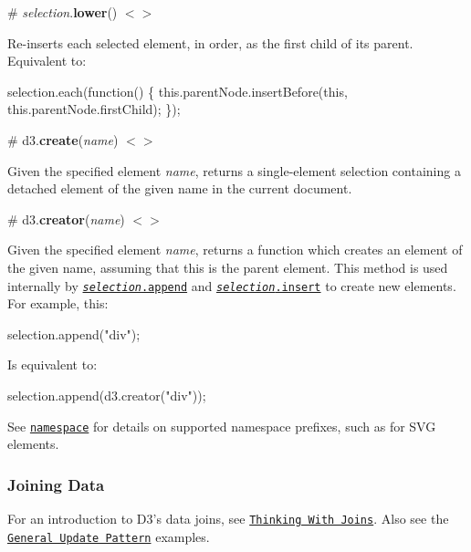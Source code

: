 \label{_selection_lower}%
\# {\itshape selection}.{\bfseries lower}() \href{https://github.com/d3/d3-selection/blob/master/src/selection/lower.js}{\tt $<$$>$}

Re-\/inserts each selected element, in order, as the first child of its parent. Equivalent to\+:


\begin{DoxyCode}
selection.each(function() \{
  this.parentNode.insertBefore(this, this.parentNode.firstChild);
\});
\end{DoxyCode}


\label{_create}%
\# d3.{\bfseries create}({\itshape name}) \href{https://github.com/d3/d3-selection/blob/master/src/create.js}{\tt $<$$>$}

Given the specified element {\itshape name}, returns a single-\/element selection containing a detached element of the given name in the current document.

\label{_creator}%
\# d3.{\bfseries creator}({\itshape name}) \href{https://github.com/d3/d3-selection/blob/master/src/creator.js}{\tt $<$$>$}

Given the specified element {\itshape name}, returns a function which creates an element of the given name, assuming that {\ttfamily this} is the parent element. This method is used internally by \href{#selection_append}{\tt {\itshape selection}.append} and \href{#selection_insert}{\tt {\itshape selection}.insert} to create new elements. For example, this\+:


\begin{DoxyCode}
selection.append("div");
\end{DoxyCode}


Is equivalent to\+:


\begin{DoxyCode}
selection.append(d3.creator("div"));
\end{DoxyCode}


See \href{#namespace}{\tt namespace} for details on supported namespace prefixes, such as for S\+VG elements.

\subsubsection*{Joining Data}

For an introduction to D3’s data joins, see \href{http://bost.ocks.org/mike/join/}{\tt Thinking With Joins}. Also see the \href{http://bl.ocks.org/mbostock/3808218}{\tt General Update Pattern} examples.

